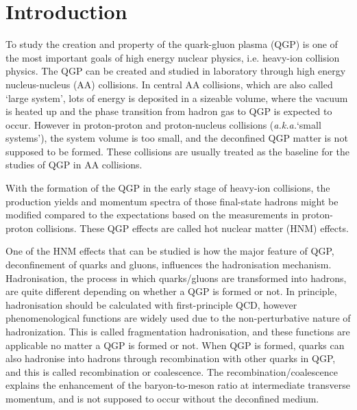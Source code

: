 \newcommand{\aka}{\mbox{\itshape a.k.a.}\xspace}
\section{Introduction}
To study the creation and property of the quark-gluon plasma (QGP)
is one of the most important goals of high energy nuclear physics,
i.e. heavy-ion collision physics.
The QGP can be created and studied in laboratory through high energy nucleus-nucleus (AA) collisions.
In central AA collisions, which are also called `large system',
lots of energy is deposited in a sizeable volume,
where the vacuum is heated up and the phase transition from hadron gas to QGP is expected to occur.
However in proton-proton and proton-nucleus collisions (\aka `small systems'),
the system volume is too small, and the deconfined QGP matter is not supposed to be formed.
These collisions are usually treated as the baseline for the studies of QGP in AA collisions.

With the formation of the QGP in the early stage of heavy-ion collisions,
the production yields and momentum spectra of those final-state hadrons might be
modified compared to the expectations based on the measurements in proton-proton collisions.
These QGP effects are called hot nuclear matter (HNM) effects. 

One of the HNM effects that can be studied is how the major feature of QGP,
deconfinement of quarks and gluons, influences the hadronisation mechanism.
Hadronisation, the process in which quarks/gluons are transformed into hadrons,
are quite different depending on whether a QGP is formed or not.
In principle, hadronisation should be calculated with first-principle QCD,
however phenomenological functions are widely used due to the non-perturbative nature of hadronization.
This is called fragmentation hadronisation,
and these functions are applicable no matter a QGP is formed or not.
When QGP is formed, quarks can also hadronise into hadrons through recombination with other quarks in QGP, and this is called recombination or coalescence. The recombination/coalescence explains the enhancement of the baryon-to-meson ratio at intermediate transverse momentum, and is not supposed to occur without the deconfined medium. 

